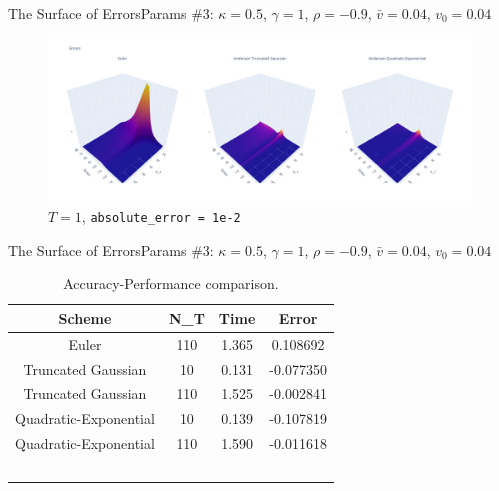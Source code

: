 \begin{frame}{The Surface of Errors}{Params \#3: $\kappa = 0.5$, $\gamma = 1$, $\rho = -0.9$, $\bar v = 0.04$, $v_0 = 0.04$}
    \begin{figure}
        \includegraphics[width=\textwidth]{part4/pictures/err_surface_strike_N_T.pdf}
        \caption{$T=1$, \texttt{absolute\_error = 1e-2}}
    \end{figure}
\end{frame}

\begin{frame}{The Surface of Errors}{Params \#3: $\kappa = 0.5$, $\gamma = 1$, $\rho = -0.9$, $\bar v = 0.04$, $v_0 = 0.04$}
    \begin{table}
    \begin{tabular}{c c c c}
        \hline
        \textbf{Scheme} & \textbf{N\_T} & \textbf{Time} & \textbf{Error}\\
        \hline
        Euler                 &      110      &    1.365      &    0.108692   \\\hline
        Truncated Gaussian    &      10       &    0.131      &    -0.077350  \\
        Truncated Gaussian    &      110      &    1.525      &    -0.002841  \\\hline
        Quadratic-Exponential &      10       &    0.139      &    -0.107819  \\
        Quadratic-Exponential &      110      &    1.590      &    -0.011618  \\
        \hline
        \
    \end{tabular}
    \caption{Accuracy-Performance comparison.}
    \end{table}
\end{frame}

